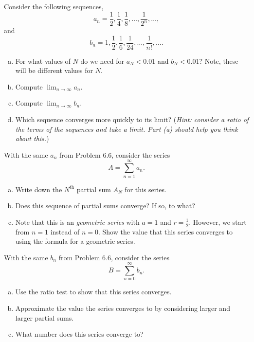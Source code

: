 \begin{problem}
Consider the following sequences,
\[
a_n = \frac{1}{2}, \frac{1}{4}, \frac{1}{8}, \dots, \frac{1}{2^n}, \dots,
\]
and
\[
b_n =  1, \frac{1}{2}, \frac{1}{6},\frac{1}{24}, \dots,\frac{1}{n!}, \dots.
\]
\begin{enumerate}[(a)]
    \item For what values of $N$ do we need for $a_N<0.01$ and $b_N<0.01$? Note, these will be different values for $N$.
    \item Compute $\displaystyle{\lim_{n\to \infty} a_n}$.
    \item Compute $\displaystyle{\lim_{n\to \infty} b_n}$.
    \item Which sequence converges more quickly to its limit? (\emph{Hint: consider a ratio of the terms of the sequences and take a limit. Part (a) should help you think about this.})
\end{enumerate}
\end{problem}

\begin{problem}
With the same $a_n$ from Problem 6.6, consider the series
\[
A = \sum_{n=1}^\infty a_n.
\]
\begin{enumerate}[(a)]
    \item Write down the $N^\textrm{th}$ partial sum $A_N$ for this series.
    \item Does this sequence of partial sums converge? If so, to what?
    \item Note that this is an \emph{geometric series} with $a=1$ and $r=\frac{1}{2}$. However, we start from $n=1$ instead of $n=0$. Show the value that this series converges to using the formula for a geometric series.
\end{enumerate}
\end{problem}

\begin{problem}
With the same $b_n$ from Problem 6.6, consider the series
\[
B = \sum_{n=0}^\infty b_n.
\]
\begin{enumerate}[(a)]
    \item Use the ratio test to show that this series converges.
    \item Approximate the value the series converges to by considering larger and larger partial sums.
    \item What number does this series converge to?
\end{enumerate}
\end{problem}


